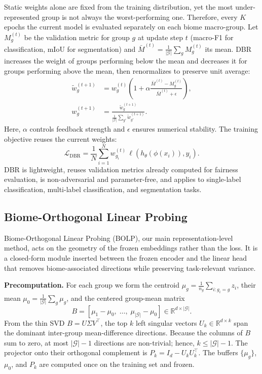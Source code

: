 \documentclass[10pt,twocolumn,letterpaper]{article}
\begin{document}
Static weights alone are fixed from the training distribution, yet the most under-represented group is not always the worst-performing one. Therefore, every \(K\) epochs the current model is evaluated separately on each biome macro-group. Let \(M_g^{(t)}\) be the validation metric for group \(g\) at update step \(t\) (macro-F1 for classification, mIoU for segmentation) and \(\bar{M}^{(t)}=\frac{1}{|\mathcal{G}|}\sum_g M_g^{(t)}\) its mean. DBR increases the weight of groups performing below the mean and decreases it for groups performing above the mean, then renormalizes to preserve unit average:
\begin{align}
\tilde{w}^{(t+1)}_g &= w^{(t)}_g \left(1 + \alpha \frac{\bar{M}^{(t)} - M_g^{(t)}}{\bar{M}^{(t)} + \epsilon}\right), \\
w^{(t+1)}_g &= \frac{\tilde{w}^{(t+1)}_g}{\frac{1}{|\mathcal{G}|}\sum_{g'} \tilde{w}^{(t+1)}_{g'}}.
\end{align}
Here, \(\alpha\) controls feedback strength and \(\epsilon\) ensures numerical stability. The training objective reuses the current weights:
\begin{equation}
\mathcal{L}_{\mathrm{DBR}} = \frac{1}{N} \sum_{i=1}^N w^{(t)}_{g_i} \, \ell(h_\theta(\phi(x_i)), y_i).
\end{equation}
DBR is lightweight, reuses validation metrics already computed for fairness evaluation, is non-adversarial and parameter-free, and applies to single-label classification, multi-label classification, and segmentation tasks.

\subsection{Biome-Orthogonal Linear Probing}
Biome-Orthogonal Linear Probing (BOLP), our main representation-level method, acts on the geometry of the frozen embeddings rather than the loss. It is a closed-form module inserted between the frozen encoder and the linear head that removes biome-associated directions while preserving task-relevant variance.

\textbf{Precomputation.} For each group we form the centroid $\mu_g=\frac{1}{n_g}\sum_{i:g_i=g}z_i$, their mean $\mu_0=\frac{1}{|\mathcal{G}|}\sum_{g}\mu_g$, and the centered group-mean matrix
\begin{equation}
B=\left[\mu_{1}-\mu_{0},\;\ldots,\;\mu_{|\mathcal{G}|}-\mu_{0}\right]\in\mathbb{R}^{d\times|\mathcal{G}|}.
\end{equation}
From the thin SVD $B=U\Sigma V^{\top}$, the top $k$ left singular vectors $U_k\in\mathbb{R}^{d\times k}$ span the dominant inter-group mean-difference directions. Because the columns of $B$ sum to zero, at most $|\mathcal{G}|-1$ directions are non-trivial; hence, $k\le|\mathcal{G}|-1$. The projector onto their orthogonal complement is $P_k=I_d-U_kU_k^{\top}$. The buffers $\{\mu_g\}$, $\mu_0$, and $P_k$ are computed once on the training set and frozen.
\end{document}
